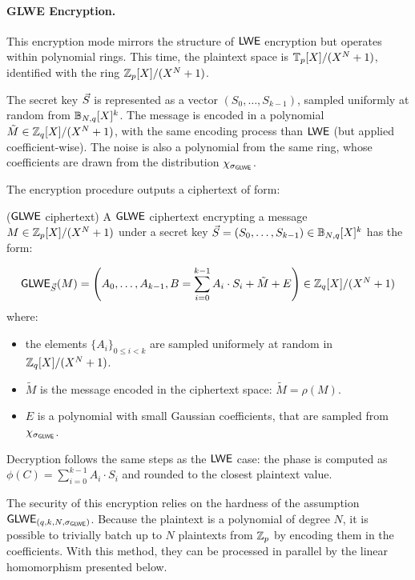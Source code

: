 \paragraph{GLWE Encryption.} This encryption mode mirrors the structure of $\textsf{LWE}$ encryption but operates within polynomial rings.
This time, the plaintext space is $\mathbb{T}_p[X] / (X^N + 1)$, identified with the ring $\mathbb{Z}_p[X] / (X^N + 1)$.

The secret key $\vec S$ is represented as a vector $(S_0, \dots, S_{k-1})$, sampled uniformly at random from $\mathbb{B}_{N, q}[X]^k$. 
%
The message is encoded in a polynomial $\tilde M \in \mathbb{Z}_q[X] / (X^N + 1)$, with the same encoding process than $\textsf{LWE}$ (but applied coefficient-wise). The noise is also a polynomial from the same ring, whose coefficients are drawn from the distribution $\chi_{\sigma_{\textsf{GLWE}}}$.
%

The encryption procedure outputs a ciphertext of form:


\begin{definition}($\textsf{GLWE}$ ciphertext)
	A $\textsf{GLWE}$ ciphertext encrypting a message $M \in \mathbb{Z}_p[X] / (X^N + 1)$ under a secret key $\vec S = (S_0, \dots, S_{k-1}) \in \mathbb{B}_{N, q}[X]^k$ has the form:
	
	\begin{equation*}
		\textsf{GLWE}_{\vec S}(M) = \left ( A_0, \dots, A_{k-1}, B = \sum_{i=0}^{k-1} A_i \cdot S_i + \tilde M + E \right ) \in \mathbb{Z}_q[X] / (X^N + 1)
	\end{equation*}
	where:
	\begin{itemize}
		\item the elements $\{A_i\}_{0 \le i < k}$ are sampled uniformely at random in $\mathbb{Z}_q[X] / (X^N + 1)$.
		\item $\tilde M$ is the message encoded in the ciphertext space: $\tilde M = \rho(M)$.
		\item $E$ is a polynomial with small Gaussian coefficients, that are sampled from $\chi_{\sigma_{\textsf{GLWE}}}$.
	\end{itemize}
\end{definition}



Decryption follows the same steps as the $\textsf{LWE}$ case: the phase is computed as $\phi(C) = \sum_{i=0}^{k-1} A_i \cdot S_i$ and rounded to the closest plaintext value.


The security of this encryption relies on the hardness of the assumption $\textsf{GLWE}_{(q, k, N, \sigma_{\textsf{GLWE}})}$. Because the plaintext is a polynomial of degree $N$, it is possible to trivially batch up to $N$ plaintexts from $\mathbb{Z}_p$ by encoding them in the coefficients. With this method, they can be processed in parallel by the linear homomorphism presented below.
\medskip

